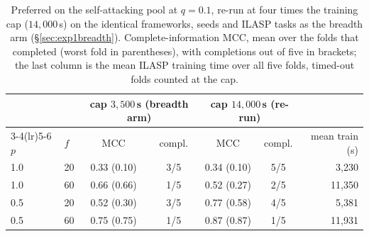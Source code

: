\begin{table}[t]
\centering
\footnotesize
\caption{Preferred on the self-attacking pool at $q{=}0.1$, re-run at four times
the training cap ($14{,}000$\,s) on the identical frameworks, seeds and ILASP
tasks as the breadth arm (\S\ref{sec:exp1breadth}). Complete-information MCC,
mean over the folds that completed (worst fold in parentheses), with
completions out of five in brackets; the last column is the mean ILASP
training time over all five folds, timed-out folds counted at the cap.}
\label{tab:prfrecap}
\begin{tabular}{llccccr}
\toprule
& & \multicolumn{2}{c}{cap $3{,}500$\,s (breadth arm)} & \multicolumn{2}{c}{cap $14{,}000$\,s (re-run)}\\
\cmidrule(lr){3-4}\cmidrule(lr){5-6}
$p$ & $f$ & MCC & compl. & MCC & compl. & mean train (s)\\
\midrule
1.0 & 20 & 0.33 (0.10) & 3/5 & 0.34 (0.10) & 5/5 & 3,230\\
1.0 & 60 & 0.66 (0.66) & 1/5 & 0.52 (0.27) & 2/5 & 11,350\\
0.5 & 20 & 0.52 (0.30) & 3/5 & 0.77 (0.58) & 4/5 & 5,381\\
0.5 & 60 & 0.75 (0.75) & 1/5 & 0.87 (0.87) & 1/5 & 11,931\\
\bottomrule\end{tabular}\end{table}
